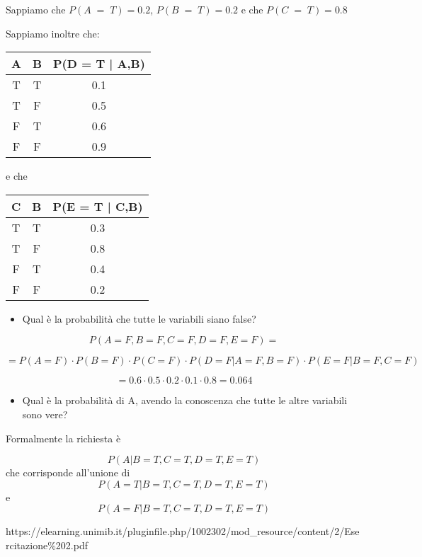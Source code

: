 \documentclass{article}
\begin{document}
Sappiamo che \(P(A \; = \; T) = 0.2 \), \(P(B \; = \; T) = 0.2 \) e che \(P(C \; = \; T) = 0.8 \)


Sappiamo inoltre che:

\begin{tabular}{|c|c|c|}
	\hline
	A & B & P(D = T | A,B) \\ \hline
	T & T & 0.1        \\ \hline
	T & F & 0.5        \\ \hline
	F & T & 0.6        \\ \hline
	F & F & 0.9        \\ \hline
\end{tabular}

 e che  \\
\begin{tabular}{|c|c|c|}
 	\hline
 	C & B & P(E = T | C,B) \\ \hline
 	T & T & 0.3        \\ \hline
 	T & F & 0.8        \\ \hline
 	F & T & 0.4        \\ \hline
 	F & F & 0.2        \\ \hline
\end{tabular}

\begin{itemize}
	\item Qual è la probabilità che tutte le variabili siano false?
\end{itemize}


\[ P(A = F, B = F, C =F, D = F, E = F) = \] 

\[ = P(A = F) \cdot P(B = F) \cdot P(C = F) \cdot  P(D = F | A=F, B = F) \cdot P(E = F | B=F, C = F) \] 

\[ = 0.6 \cdot 0.5 \cdot 0.2 \cdot 0.1 \cdot 0.8 = 0.064 \] 

\begin{itemize}
	\item Qual è la probabilità di A, avendo la conoscenza che tutte le altre variabili sono vere?
\end{itemize}

Formalmente la richiesta è

\[ P(A  |B = T, C = T, D = T, E = T)\] che corrisponde all'unione di  \[ P(A = T |B = T, C = T, D = T, E = T)\] e \[ P(A = F |B = T, C = T, D = T, E = T)\]

https://elearning.unimib.it/pluginfile.php/1002302/mod\_resource/content/2/Esercitazione\%202.pdf
\
\end{document}
